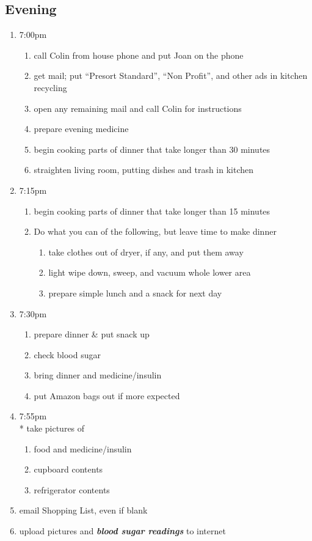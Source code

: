 \documentclass[12pt,letterpaper]{article}
\begin{document}
\begin{multicols}{2}
\subsection*{Evening}
\begin{enumerate}
	\item 7:00pm
		\begin{enumerate}
			\item call Colin from house phone and put Joan on the phone
			\item get mail; put ``Presort Standard'', ``Non Profit'', and other ads in kitchen recycling
			\item open any remaining mail and call Colin for instructions
			\item prepare evening medicine
			\item begin cooking parts of dinner that take longer than 30 minutes
			\item straighten living room, putting dishes and trash in kitchen
		\end{enumerate}
	\item 7:15pm 
		\begin{enumerate}
			\item begin cooking parts of dinner that take longer than 15 minutes
			\item	Do what you can of the following, but leave time to make dinner
				\begin{enumerate}
					\item take clothes out of dryer, if any, and put them away
					\item light wipe down, sweep, and vacuum whole lower area
					\item prepare simple lunch and a snack for next day
				\end{enumerate}
		\end{enumerate}
	\item 7:30pm
		\begin{enumerate}
			\item prepare dinner \& put snack up
			\item check blood sugar
			\item bring dinner and medicine/insulin
			\item put Amazon bags out if more expected
		\end{enumerate}
	\item 7:55pm \\*
		take pictures of 
		\begin{enumerate}
			\item food and medicine/insulin
			\item	cupboard contents
			\item	refrigerator contents
		\end{enumerate}
	\item email Shopping List, even if blank
	\item upload pictures and \textit{\textbf{blood sugar readings}} to internet
\end{enumerate}
\end{multicols}
\end{document}
